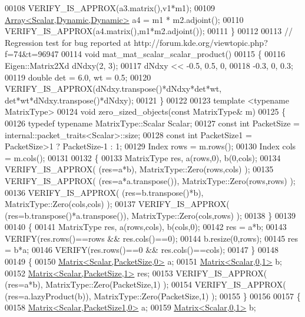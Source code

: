 \begin{DoxyCode}
00108   VERIFY\_IS\_APPROX(a3.matrix(),v1*m1);
00109   \hyperlink{group___core___module_class_eigen_1_1_array}{Array<Scalar,Dynamic,Dynamic>} a4 = m1 * m2.adjoint();
00110   VERIFY\_IS\_APPROX(a4.matrix(),m1*m2.adjoint());
00111 \}
00112 
00113 \textcolor{comment}{// Regression test for bug reported at http://forum.kde.org/viewtopic.php?f=74&t=96947}
00114 \textcolor{keywordtype}{void} mat\_mat\_scalar\_scalar\_product()
00115 \{
00116   Eigen::Matrix2Xd dNdxy(2, 3);
00117   dNdxy << -0.5, 0.5, 0,
00118            -0.3, 0, 0.3;
00119   \textcolor{keywordtype}{double} det = 6.0, wt = 0.5;
00120   VERIFY\_IS\_APPROX(dNdxy.transpose()*dNdxy*det*wt, det*wt*dNdxy.transpose()*dNdxy);
00121 \}
00122 
00123 \textcolor{keyword}{template} <\textcolor{keyword}{typename} MatrixType> 
00124 \textcolor{keywordtype}{void} zero\_sized\_objects(\textcolor{keyword}{const} MatrixType& m)
00125 \{
00126   \textcolor{keyword}{typedef} \textcolor{keyword}{typename} MatrixType::Scalar Scalar;
00127   \textcolor{keyword}{const} \textcolor{keywordtype}{int} PacketSize  = internal::packet\_traits<Scalar>::size;
00128   \textcolor{keyword}{const} \textcolor{keywordtype}{int} PacketSize1 = PacketSize>1 ?  PacketSize-1 : 1;
00129   Index rows = m.rows();
00130   Index cols = m.cols();
00131   
00132   \{
00133     MatrixType res, a(rows,0), b(0,cols);
00134     VERIFY\_IS\_APPROX( (res=a*b), MatrixType::Zero(rows,cols) );
00135     VERIFY\_IS\_APPROX( (res=a*a.transpose()), MatrixType::Zero(rows,rows) );
00136     VERIFY\_IS\_APPROX( (res=b.transpose()*b), MatrixType::Zero(cols,cols) );
00137     VERIFY\_IS\_APPROX( (res=b.transpose()*a.transpose()), MatrixType::Zero(cols,rows) );
00138   \}
00139   
00140   \{
00141     MatrixType res, a(rows,cols), b(cols,0);
00142     res = a*b;
00143     VERIFY(res.rows()==rows && res.cols()==0);
00144     b.resize(0,rows);
00145     res = b*a;
00146     VERIFY(res.rows()==0 && res.cols()==cols);
00147   \}
00148   
00149   \{
00150     \hyperlink{group___core___module_class_eigen_1_1_matrix}{Matrix<Scalar,PacketSize,0>} a;
00151     \hyperlink{group___core___module_class_eigen_1_1_matrix}{Matrix<Scalar,0,1>} b;
00152     \hyperlink{group___core___module_class_eigen_1_1_matrix}{Matrix<Scalar,PacketSize,1>} res;
00153     VERIFY\_IS\_APPROX( (res=a*b), MatrixType::Zero(PacketSize,1) );
00154     VERIFY\_IS\_APPROX( (res=a.lazyProduct(b)), MatrixType::Zero(PacketSize,1) );
00155   \}
00156   
00157   \{
00158     \hyperlink{group___core___module_class_eigen_1_1_matrix}{Matrix<Scalar,PacketSize1,0>} a;
00159     \hyperlink{group___core___module_class_eigen_1_1_matrix}{Matrix<Scalar,0,1>} b;

\end{DoxyCode}

